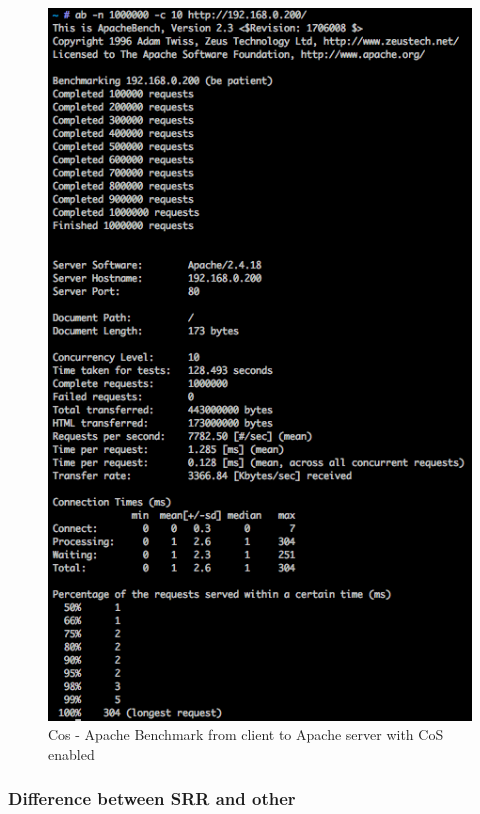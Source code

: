 \documentclass{article}
\begin{document}
\begin{figure}[H]
\centering
\includegraphics[width=12cm]{figures/calais-ab2.png}
\caption{Cos - Apache Benchmark from client to Apache server with CoS enabled}
\centering
\label{fig:ab2_calais_scenario_3}
\end{figure}

\subsubsection{Difference between SRR and other}
\end{document}
